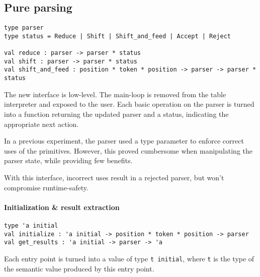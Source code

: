 \documentclass[twoside,a4paper]{article}
\begin{document}
\subsection{Pure parsing}

\begin{lstlisting}
type parser
type status = Reduce | Shift | Shift_and_feed | Accept | Reject

val reduce : parser -> parser * status
val shift : parser -> parser * status
val shift_and_feed : position * token * position -> parser -> parser * status
\end{lstlisting}


The new interface is low-level.  The main-loop is removed from the table
interpreter and exposed to the user.  Each basic operation on the parser is
turned into a function returning the updated parser and a status, indicating
the appropriate next action.

In a previous experiment, the parser used a type parameter to enforce
correct uses of the primitives.  However, this
proved cumbersome when manipulating the parser state, while providing
few benefits.

With this interface, incorrect uses result in a rejected parser, but won't
compromise runtime-safety.


\paragraph{Initialization \& result extraction}

\begin{lstlisting}
type 'a initial
val initialize : 'a initial -> position * token * position -> parser
val get_results : 'a initial -> parser -> 'a
\end{lstlisting}

Each entry point is turned into a value of type \texttt{t initial},
where \texttt{t} is the type of the semantic value produced by this
entry point.
\end{document}
